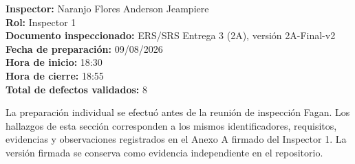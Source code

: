 \documentclass[12pt,a4paper]{article}
\newcommand{\VersionERS}{2A-Final-v2}
\begin{document}
\textbf{Inspector:} Naranjo Flores Anderson Jeampiere\\
\textbf{Rol:} Inspector 1\\
\textbf{Documento inspeccionado:} ERS/SRS Entrega 3 (2A), versión \VersionERS\\
\textbf{Fecha de preparación:} 09/08/2026\\
\textbf{Hora de inicio:} 18:30\\
\textbf{Hora de cierre:} 18:55\\
\textbf{Total de defectos validados:} 8

La preparación individual se efectuó antes de la reunión de inspección Fagan. Los hallazgos de esta sección corresponden a los mismos identificadores, requisitos, evidencias y observaciones registrados en el Anexo A firmado del Inspector 1. La versión firmada se conserva como evidencia independiente en el repositorio.
\end{document}
